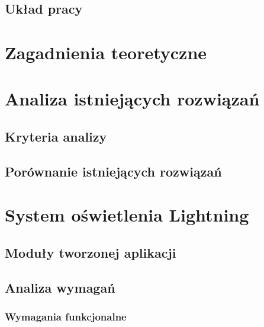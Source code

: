 \documentclass[12pt]{report}
\begin{document}

\section{Układ pracy}


\chapter[Zagadnienia teoretyczne]{Zagadnienia teoretyczne}
\label{teoria}


\chapter[Analiza istniejących rozwiązań]{Analiza istniejących rozwiązań}
\label{analiza}

\section{Kryteria analizy}


\section{Porównanie istniejących rozwiązań}


\chapter{System oświetlenia Lightning}
\label{lightning}


\section{Moduły tworzonej aplikacji}


\section{Analiza wymagań}

\subsection{Wymagania funkcjonalne}
\end{document}
